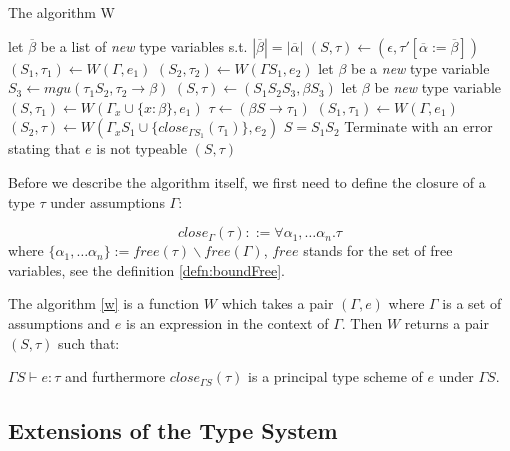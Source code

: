 \begin{algorithm}[t]
\caption{The algorithm W \cite{milner1978theory}}
\label{w}
\begin{algorithmic}[1]
    \State let $\overline{\beta}$ be a list of \emph{new} type variables s.t. $|\overline{\beta}| = |\overline{\alpha}|$
    \State $(S, \tau) \gets (\epsilon, \tau' [\overline{\alpha} := \overline{\beta}])$
    \State $(S_1, \tau_1) \gets W(\Gamma, e_1)$
    \State $(S_2, \tau_2) \gets W(\Gamma S_1, e_2)$
    \State let $\beta$ be a \emph{new} type variable
    \State $S_3 \gets mgu (\tau_1 S_2, \tau_2 \rightarrow \beta)$
    \State $(S, \tau) \gets (S_1 S_2 S_3, \beta S_3)$
    \State let $\beta$ be \emph{new} type variable
    \State $(S, \tau_1) \gets W(\Gamma_x \cup \{x : \beta\}, e_1)$
    \State $\tau \gets (\beta S \rightarrow \tau_1)$
    \State $(S_1, \tau_1) \gets W(\Gamma, e_1)$
    \State $(S_2, \tau) \gets W(\Gamma_x S_1 \cup \{close_{\Gamma S_1}(\tau_1)\}, e_2)$
    \State $S = S_1 S_2$
    \Else
    \State Terminate with an error stating that $e$ is not typeable
    \EndIf
    \State \Return $(S, \tau)$
\EndFunction
\end{algorithmic}
\end{algorithm}

Before we describe the algorithm itself, we first need to define the closure of a type $\tau$ under assumptions $\Gamma$:

\begin{defn}
    \label{defn:close}
    $$close_\Gamma(\tau) ::= \forall \alpha_1, \dots \alpha_n . \tau$$
    where $\{\alpha_1, \dots \alpha_n\} := free(\tau) \backslash free(\Gamma)$, $free$ stands for the set of free variables, see the definition \ref{defn:boundFree}.
\end{defn}

The algorithm \ref{w} is a function $W$ which takes a pair $(\Gamma, e)$ where $\Gamma$ is a set of assumptions and $e$ is an expression in the context of $\Gamma$. Then $W$ returns a pair $(S, \tau)$ such that:

$\Gamma S \vdash e : \tau$ and furthermore $close_{\Gamma S}(\tau)$ is a principal type scheme of $e$ under $\Gamma S$.

\subsection{Extensions of the Type System}

